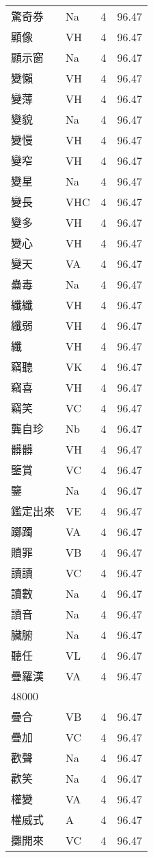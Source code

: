 \documentclass[twocolumn]{book}
\begin{document}
\begin{supertabular}{llrr}
驚奇券 & Na & 4 &  96.47\\
顯像 & VH & 4 &  96.47\\
顯示窗 & Na & 4 &  96.47\\
變懶 & VH & 4 &  96.47\\
變薄 & VH & 4 &  96.47\\
變貌 & Na & 4 &  96.47\\
變慢 & VH & 4 &  96.47\\
變窄 & VH & 4 &  96.47\\
變星 & Na & 4 &  96.47\\
變長 & VHC & 4 &  96.47\\
變多 & VH & 4 &  96.47\\
變心 & VH & 4 &  96.47\\
變天 & VA & 4 &  96.47\\
蠱毒 & Na & 4 &  96.47\\
纖纖 & VH & 4 &  96.47\\
纖弱 & VH & 4 &  96.47\\
纖 & VH & 4 &  96.47\\
竊聽 & VK & 4 &  96.47\\
竊喜 & VH & 4 &  96.47\\
竊笑 & VC & 4 &  96.47\\
龔自珍 & Nb & 4 &  96.47\\
髒髒 & VH & 4 &  96.47\\
鑒賞 & VC & 4 &  96.47\\
鑒 & Na & 4 &  96.47\\
鑑定出來 & VE & 4 &  96.47\\
躑躅 & VA & 4 &  96.47\\
贖罪 & VB & 4 &  96.47\\
讀讀 & VC & 4 &  96.47\\
讀數 & Na & 4 &  96.47\\
讀音 & Na & 4 &  96.47\\
臟腑 & Na & 4 &  96.47\\
聽任 & VL & 4 &  96.47\\
疊羅漢 & VA & 4 &  96.47\\
48000\\
疊合 & VB & 4 &  96.47\\
疊加 & VC & 4 &  96.47\\
歡聲 & Na & 4 &  96.47\\
歡笑 & Na & 4 &  96.47\\
權變 & VA & 4 &  96.47\\
權威式 & A & 4 &  96.47\\
攤開來 & VC & 4 &  96.47\\

\end{supertabular}
\end{document}
